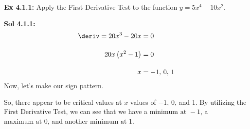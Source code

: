 \begin{tcolorbox}[example]
    \textbf{Ex 4.1.1: } Apply the First Derivative Test to the function $y = 5x^4 - 10x^2$.
\end{tcolorbox}
\begin{tcolorbox}[solution]
    \textbf{Sol 4.1.1: } \begin{align*}
        \deriv = 20x^3 - 20x &= 0 \\[11pt]
        20x\left(x^2 - 1\right) &= 0 \\[11pt]
        x &= -1, \, 0, \, 1
    \end{align*} 
    Now, let's make our sign pattern. \\
    \begin{center}
    \end{center}
    So, there appear to be critical values at $x$ values of $-1, \, 0$, and $1$. By utilizing the First Derivative Test, we can see that we have a $\boxed{\text{minimum at } -1}$, a $\boxed{\text{maximum at } 0}$, and another $\boxed{\text{minimum at } 1}$.
\end{tcolorbox} \vspace{11pt}

